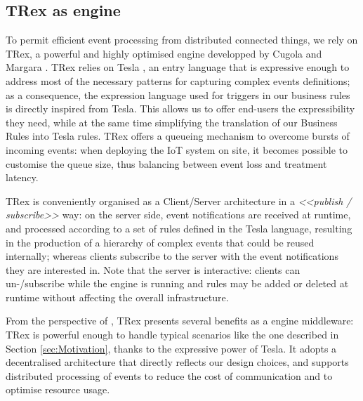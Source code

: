 \subsection{TRex as \CEP engine}
\label{sec:CG-TRex}

To permit efficient event processing from distributed connected things, we rely on TRex, a powerful and highly optimised \CEP engine developped by Cugola and Margara \cite{cugola-12}. TRex relies on Tesla \cite{Cugola-Margara:2010}, an entry language that is expressive enough to address most of the necessary patterns for capturing complex events definitions; as a consequence, the expression language used for triggers in our business rules is directly inspired from Tesla. This allows us to offer end-users the expressibility they need, while at the same time simplifying the translation of our Business Rules into Tesla rules. TRex offers a queueing mechanism to overcome bursts of incoming events: when deploying the IoT system on site, it becomes possible to customise the queue size, thus balancing between event loss and treatment latency. 

TRex is conveniently organised as a Client/Server architecture in a \textit{<<publish / subscribe>>} way: on the server side, event notifications are received at runtime, and processed according to a set of rules defined in the Tesla language, resulting in the production of a hierarchy of complex events that could be reused internally; whereas clients subscribe to the server with the event notifications they are interested in. Note that the server is interactive: clients can un-/subscribe while the engine is running and rules may be added or deleted at runtime without affecting the overall infrastructure. 

From the perspective of \IOTDSL, TRex presents several benefits as a \CEP engine middleware: TRex is powerful enough to handle typical \IOT scenarios like the one described in Section \ref{sec:Motivation}, thanks to the expressive power of Tesla. It adopts a decentralised architecture that directly reflects our design choices, and supports distributed processing of events to reduce the cost of communication and to optimise resource usage. 
